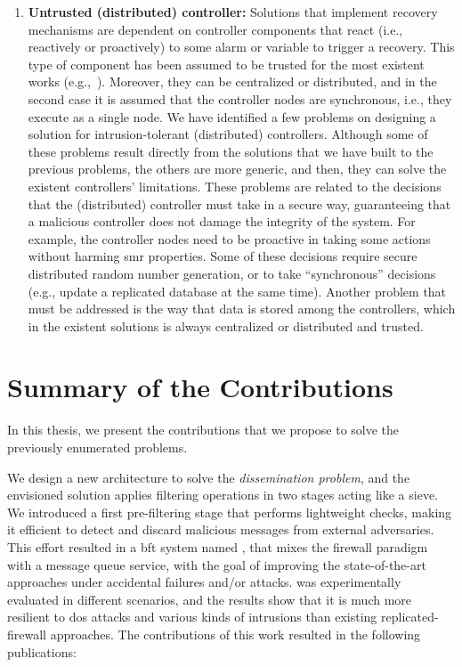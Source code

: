 \begin{enumerate}
\item \textbf{Untrusted (distributed) controller:}
Solutions that implement recovery mechanisms are dependent on controller components that react (i.e., reactively or proactively) to some alarm or variable to trigger a recovery.
This type of component has been assumed to be trusted for the most existent works (e.g.,~\cite{Roeder:2010,Platania:2014,Sousa:2010}).
Moreover, they can be centralized or distributed, and in the second case it is assumed that the controller nodes are synchronous, i.e., they execute as a single node. 
We have identified a few problems on designing a solution for intrusion-tolerant (distributed) controllers. 
Although some of these problems result directly from the solutions that we have built to the previous problems, the others are more generic, and then, they can solve the existent controllers' limitations.
These problems are related to the decisions that the (distributed) controller must take in a secure way, guaranteeing that a malicious controller does not damage the integrity of the system.
For example, the controller nodes need to be proactive in taking some actions without harming \gls{smr} properties.
Some of these decisions require secure distributed random number generation, or to take ``synchronous'' decisions (e.g., update a replicated database at the same time).  
Another problem that must be addressed is the way that data is stored among the controllers, which in the existent solutions is always centralized or distributed and trusted. 


\end{enumerate}


\section{Summary of the Contributions}
\label{sec:contributions}


In this thesis, we present the contributions that we propose to solve the previously enumerated problems. 



We design a new architecture to solve the \emph{dissemination problem}, and the envisioned solution applies filtering operations in two stages acting like a sieve.
We introduced a first pre-filtering stage that performs lightweight checks, making it efficient to detect and discard malicious messages from external adversaries.
This effort resulted in a \gls{bft} system named \sieveq, that mixes the firewall paradigm with a message queue service, with the goal of improving the state-of-the-art approaches under accidental failures and/or attacks. 
\sieveq was experimentally evaluated in different scenarios, and the results show that it is much more resilient to \gls{dos} attacks and various kinds of intrusions than existing replicated-firewall approaches.
The contributions of this work resulted in the following publications:


